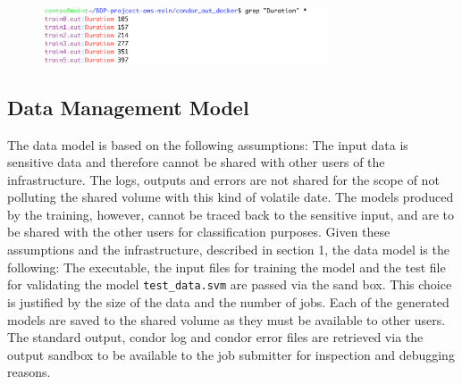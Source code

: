 \documentclass{article}
\begin{document}

\begin{figure}[!h]
    \includegraphics[width=0.75\textwidth]{./img/condor_duration_job_docker.png}
\end{figure}
\FloatBarrier%

\subsection{Data Management Model}
The data model is based on the following assumptions: The input data is sensitive data and therefore cannot be shared with other users of the infrastructure.
The logs, outputs and errors are not shared for the scope of not polluting the shared volume with this kind of volatile date.
The models produced by the training, however, cannot be traced back to the sensitive input, and are to be shared with the other users for classification purposes.
Given these assumptions and the infrastructure, described in section 1, the data model is the following:
The executable, the input files for training the model and the test file for validating the model \texttt{test\_data.svm} are passed via the sand box. 
This choice is justified by the size of the data and the number of jobs.
Each of the generated models are saved to the shared volume as they must be available to other users.
The standard output, condor log and condor error files are retrieved via the output sandbox to be available to the job submitter for inspection and debugging reasons.
\end{document}
